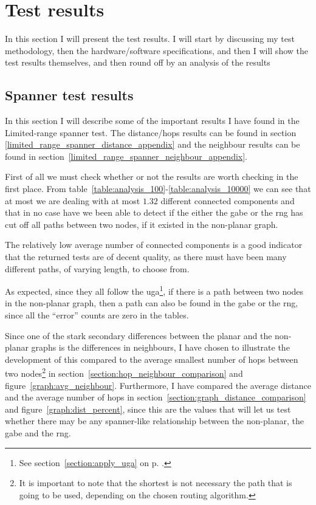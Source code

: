 \section{Test results}
\label{section:test_results}
In this section I will present the test results. I will start by discussing my test methodology, then the hardware/software specifications, and then I will show the test results themselves, and then round off by an analysis of the results 

\subsection{Spanner test results}
In this section I will  describe some of the important results I have found in the Limited-range spanner test. The distance/hops results can be found in section \ref{limited_range_spanner_distance_appendix} and the neighbour results can be found in section~\ref{limited_range_spanner_neighbour_appendix}.

First of all we must check whether or not the results are worth checking in the first place. From table~\ref{table:analysis_100}-\ref{table:analysis_10000} we can see that at most we are dealing with at most $1.32$ different connected components and that in no case have we been able to detect if the either the \ac{gabe} or the \ac{rng} has cut off all paths between two nodes, if it existed in the non-planar graph. 

The relatively low average number of connected components is a good indicator that the returned tests are of decent quality, as there must have been many different paths, of varying length, to choose from.

As expected, since they all follow the \ac{uga}\footnote{See section~\ref{section:apply_uga} on p. \pageref{section:apply_uga}.}, if there is a path between two nodes in the non-planar graph, then a path can also be found in the \ac{gabe} or the \ac{rng}, since all the ``error'' counts are zero in the tables.

Since one of the stark secondary differences between the planar and the non-planar graphs is the differences in neighbours, I have chosen to illustrate the development of this compared to the average smallest number of hops between two nodes\footnote{It is important to note that the shortest is not necessary the path that is going to be used, depending on the chosen routing algorithm.} in section~\ref{section:hop_neighbour_comparison} and figure~\ref{graph:avg_neighbour}. Furthermore, I have compared the average distance and the average number of hops in section~\ref{section:graph_distance_comparison} and figure~\ref{graph:dist_percent}, since this are the values that will let us test whether there may be any spanner-like relationship between the non-planar, the \ac{gabe} and the \ac{rng}.

